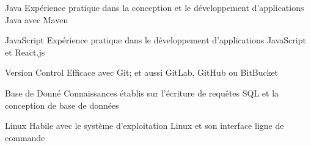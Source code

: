 

\begin{cvskills}

  \cvskill
    {Java} %
    {Expérience pratique dans la conception et le développement d'applications Java avec Maven}
    
  \cvskill
    {JavaScript} %
    {Expérience pratique dans le développement d'applications JavaScript et React.js}
    
  \cvskill
    {Version Control} %
    {Efficace avec Git; et aussi GitLab, GitHub ou BitBucket}
    
  \cvskill
    {Base de Donné} %
    {Connaissances établis sur l'écriture de requêtes SQL et la conception de base de données}
    
  \cvskill
    {Linux} %
    {Habile avec le système d'exploitation Linux et son interface ligne de commande}

\end{cvskills}
